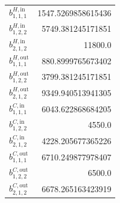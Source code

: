 \documentclass{article}%
\begin{document}
\begin{multicols*}{3}
\begin{supertabular}{lr}
	$b_{1,1,1}^{H,\text{in}}$ & 1547.5269858615436 \\%
	$b_{1,2,2}^{H,\text{in}}$ & 5749.381245171851 \\%
	$b_{2,1,2}^{H,\text{in}}$ & 11800.0 \\%
	$b_{1,1,1}^{H,\text{out}}$ & 880.8999765673402 \\%
	$b_{1,2,2}^{H,\text{out}}$ & 3799.381245171851 \\%
	$b_{2,1,2}^{H,\text{out}}$ & 9349.940513941305 \\%
	$b_{1,1,1}^{C,\text{in}}$ & 6043.622868684205 \\%
	$b_{1,2,2}^{C,\text{in}}$ & 4550.0 \\%
	$b_{2,1,2}^{C,\text{in}}$ & 4228.205677365226 \\%
	$b_{1,1,1}^{C,\text{out}}$ & 6710.249877978407 \\%
	$b_{1,2,2}^{C,\text{out}}$ & 6500.0 \\%
	$b_{2,1,2}^{C,\text{out}}$ & 6678.265163423919 \\%
\end{supertabular}%
\end{multicols*}%
\clearpage%
\end{document}
